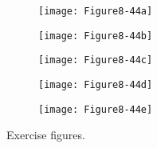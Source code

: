 \begin{figure}[!htb]
    \centering
    \begin{subfigure}{0.32\linewidth}
        \centering
        \texttt{[image: Figure8-44a]}
        \caption{}\label{fig:Figure8-44a}
    \end{subfigure}
    \hfill
    \begin{subfigure}{0.32\linewidth}
        \centering
        \texttt{[image: Figure8-44b]}
        \caption{}\label{fig:Figure8-44b}
    \end{subfigure}%
    \hfill
    \begin{subfigure}{0.32\linewidth}
        \centering
        \texttt{[image: Figure8-44c]}
        \caption{}\label{fig:Figure8-44c}
    \end{subfigure}%
    \hfill
    \begin{subfigure}{0.48\linewidth}
        \centering
        \texttt{[image: Figure8-44d]}
        \caption{}\label{fig:Figure8-44d}
    \end{subfigure}%
    \hfill
    \begin{subfigure}{0.48\linewidth}
        \centering
        \texttt{[image: Figure8-44e]}
        \caption{}\label{fig:Figure8-44e}
    \end{subfigure}%
    \caption{Exercise figures.}
    \label{fig:Figure8-44}
\end{figure}


